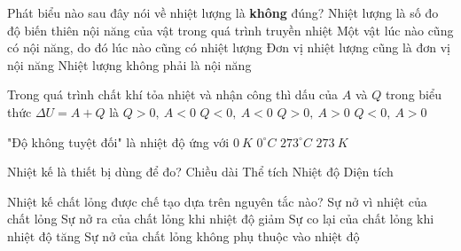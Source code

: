 \begin{ex}
Phát biểu nào sau đây nói về nhiệt lượng là \textbf{không} đúng?
\choice
{Nhiệt lượng là số đo độ biến thiên nội năng của vật trong quá trình truyền nhiệt}
{\True Một vật lúc nào cũng có nội năng, do đó lúc nào cũng có nhiệt lượng}
{Đơn vị nhiệt lượng cũng là đơn vị nội năng}
{Nhiệt lượng không phải là nội năng}
\end{ex}
\begin{ex}
Trong quá trình chất khí tỏa nhiệt và nhận công thì dấu của $A$ và $Q$ trong biểu thức $\Delta U = A+Q$ là
\choice
{$Q > 0,\ A < 0$}
{$Q < 0,\ A < 0$}
{$Q > 0,\ A > 0$}
{\True $Q < 0,\ A > 0$}
\end{ex}
\begin{ex}
"Độ không tuyệt đối" là nhiệt độ ứng với
\choice
{\True $0 \ K$}
{$0^\circ C$}
{$273^\circ C$}
{$273 \ K$}
\end{ex}
\begin{ex}
Nhiệt kế là thiết bị dùng để đo?
\choice
{Chiều dài}
{Thể tích}
{\True Nhiệt độ}
{Diện tích}
\end{ex}
\begin{ex}
Nhiệt kế chất lỏng được chế tạo dựa trên nguyên tắc nào?
\choice
{\True Sự nở vì nhiệt của chất lỏng}
{Sự nở ra của chất lỏng khi nhiệt độ giảm}
{Sự co lại của chất lỏng khi nhiệt độ tăng}
{Sự nở của chất lỏng không phụ thuộc vào nhiệt độ}
\end{ex}
